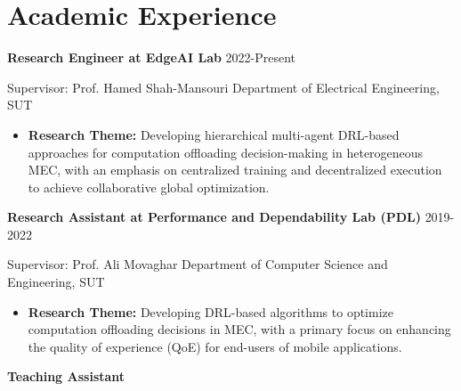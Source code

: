 \documentclass[11pt]{article}
\begin{document}
\section{Academic Experience}


\large{\textbf{Research Engineer at EdgeAI Lab} } \hfill 2022-Present\vspace{1mm}
\normalsize

	\hspace{-5.5mm}Supervisor: Prof. {Hamed Shah-Mansouri} \href{https://scholar.google.com/citations?user=dcjIFccAAAAJ&hl=en&oi=ao}{\small \faExternalLink} \href{https://scholar.google.com/citations?user=BXNelwwAAAAJ\&hl=en}\hfill Department of Electrical Engineering, SUT
	\begin{itemize}
		\vspace{-2mm}  
		\item\textbf{Research Theme:} Developing hierarchical multi-agent DRL-based approaches for computation offloading decision-making in heterogeneous MEC, with an emphasis on centralized training and decentralized execution to achieve collaborative global optimization.\\ 
	\end{itemize}
\vspace{-5mm}
\large{\textbf{Research Assistant at Performance and Dependability Lab (PDL)} }\hfill 2019-2022\vspace{1mm}

\normalsize
\hspace{-5.5mm}Supervisor: Prof. Ali Movaghar \hfill Department of Computer Science and Engineering, SUT\vspace{-2mm}
\begin{itemize}
	\item\textbf{Research Theme:} Developing DRL-based algorithms to optimize computation offloading decisions in MEC, with a primary focus on enhancing the quality of experience (QoE) for end-users of mobile applications.
\end{itemize}
\large\large\textbf{Teaching Assistant}  \vspace{-2mm}
\normalsize
\end{document}
